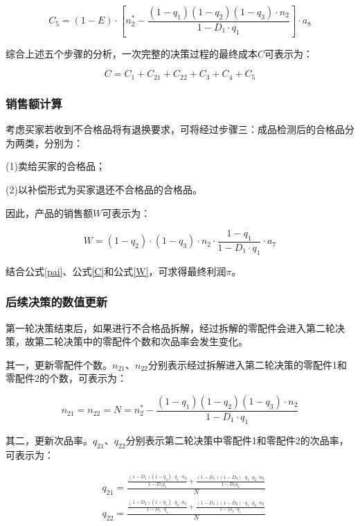 \documentclass[withoutpreface,bwprint]{cumcmthesis} %
\begin{document}
\begin{equation}
	C_5 = (1 - E) \cdot [n_2^* - \frac{(1 - q_1)(1 - q_2)(1 - q_3) \cdot n_2}{1 - D_1 \cdot q_1}]\cdot a_8
\end{equation}

综合上述五个步骤的分析，一次完整的决策过程的最终成本$C$可表示为：

\begin{equation}
    C = C_1 + C_{21} + C_{22} + C_3 + C_4 + C_5
\end{equation}

\subsubsection{销售额计算}

考虑买家若收到不合格品将有退换要求，可将经过步骤三：成品检测后的合格品分为两类，分别为：

(1)卖给买家的合格品；

(2)以补偿形式为买家退还不合格品的合格品。

因此，产品的销售额$W$可表示为：

\begin{equation}
	W=(1-q _2) \cdot(1-q _3) \cdot n _2 \cdot \frac{1-q _1}{1-D _1 \cdot q _1} \cdot a _7
	\label{W}
\end{equation}

结合公式\ref{pai}、公式\ref{C}和公式\ref{W}，可求得最终利润$\pi$。

\subsubsection{后续决策的数值更新}
第一轮决策结束后，如果进行不合格品拆解，经过拆解的零配件会进入第二轮决策，故第二轮决策中的零配件个数和次品率会发生变化。

其一，更新零配件个数。$n_{21}$、$n_{22}$分别表示经过拆解进入第二轮决策的零配件1和零配件2的个数，可表示为：

\begin{equation}
	n_{21}=n_{22}=N=n_2^*-\frac{\left(1-q_1\right)\left(1-q_2\right)\left(1-q_3\right) \cdot n_2}{1-D_1 \cdot q_1}
\end{equation}

其二，更新次品率。$q_{21}$、$q_{22}$分别表示第二轮决策中零配件1和零配件2的次品率，可表示为：

\begin{equation}
	\begin{aligned}
		& q_{21}=\frac{\frac{\left(1-D_1\right)\left(1-q_2\right) \cdot q_1 \cdot n_2}{1-D_1 q_1}+\frac{\left(1-D_1\right)\left(1-D_2\right) \cdot q_1 \cdot q_2 \cdot n_2}{1-D_1 q_1}}{N} \\
		& q_{22}=\frac{\frac{\left(1-D_2\right)\left(1-q_1\right) \cdot q_2 \cdot n_2}{1-D_1 \cdot q_1}+\frac{\left(1-D_1\right)\left(1-D_2\right) \cdot q_1 \cdot q_2 \cdot n_2}{1-D_1 \cdot q_1}}{N}
	\end{aligned}
\end{equation}
\end{document}
